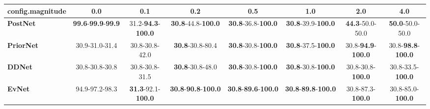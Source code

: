 \begin{tabular}{lccccccc}
\toprule
\textbf{config.magnitude} &                                        0.0 &                                0.1 &                                         0.2 &                                         0.5 &                                         1.0 &                                2.0 &                                4.0 \\
\midrule
\textbf{PostNet } &  \textbf{99.6}-\textbf{99.9}-\textbf{99.9} &  31.2-\textbf{94.3}-\textbf{100.0} &           \textbf{30.8}-44.8-\textbf{100.0} &           \textbf{30.8}-36.8-\textbf{100.0} &           \textbf{30.8}-39.9-\textbf{100.0} &            \textbf{44.3}-50.0-50.0 &            \textbf{50.0}-50.0-50.0 \\
\textbf{PriorNet} &                             30.9-31.0-31.4 &                     30.8-30.8-42.0 &                     \textbf{30.8}-30.8-80.4 &           \textbf{30.8}-30.8-\textbf{100.0} &           \textbf{30.8}-37.5-\textbf{100.0} &  30.8-\textbf{94.9}-\textbf{100.0} &  30.8-\textbf{98.8}-\textbf{100.0} \\
\textbf{DDNet   } &                             30.8-30.8-30.8 &                     30.8-30.8-31.5 &                     \textbf{30.8}-30.8-48.0 &           \textbf{30.8}-30.8-\textbf{100.0} &           \textbf{30.8}-30.8-\textbf{100.0} &           30.8-30.8-\textbf{100.0} &           30.8-33.5-\textbf{100.0} \\
\textbf{EvNet   } &                             94.9-97.2-98.3 &  \textbf{31.3}-92.1-\textbf{100.0} &  \textbf{30.8}-\textbf{90.8}-\textbf{100.0} &  \textbf{30.8}-\textbf{89.6}-\textbf{100.0} &  \textbf{30.8}-\textbf{89.8}-\textbf{100.0} &           30.8-87.3-\textbf{100.0} &           30.8-85.0-\textbf{100.0} \\
\bottomrule
\end{tabular}
